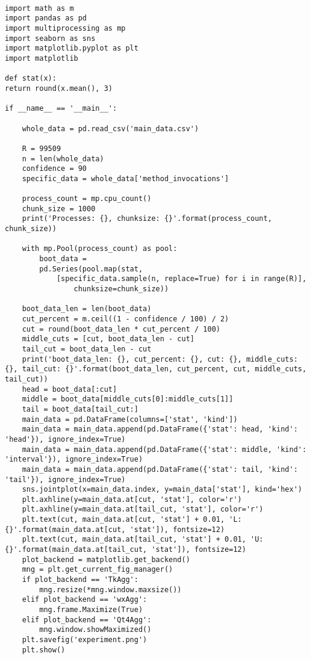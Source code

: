 \begin{lstlisting}[caption={Утилита для проведения бутстрапа и параллельных расчётов границ интервала среднего},label=bootstrap_experiment]

import math as m
import pandas as pd
import multiprocessing as mp
import seaborn as sns
import matplotlib.pyplot as plt
import matplotlib

def stat(x):
return round(x.mean(), 3)

if __name__ == '__main__':

	whole_data = pd.read_csv('main_data.csv')
	
	R = 99509
	n = len(whole_data)
	confidence = 90
	specific_data = whole_data['method_invocations']
	
	process_count = mp.cpu_count()
	chunk_size = 1000
	print('Processes: {}, chunksize: {}'.format(process_count, chunk_size))
	
	with mp.Pool(process_count) as pool:
		boot_data =
		pd.Series(pool.map(stat, 
			[specific_data.sample(n, replace=True) for i in range(R)], 
				chunksize=chunk_size))
	
	boot_data_len = len(boot_data)
	cut_percent = m.ceil((1 - confidence / 100) / 2)
	cut = round(boot_data_len * cut_percent / 100)
	middle_cuts = [cut, boot_data_len - cut]
	tail_cut = boot_data_len - cut
	print('boot_data_len: {}, cut_percent: {}, cut: {}, middle_cuts: {}, tail_cut: {}'.format(boot_data_len, cut_percent, cut, middle_cuts, tail_cut))
	head = boot_data[:cut]
	middle = boot_data[middle_cuts[0]:middle_cuts[1]]
	tail = boot_data[tail_cut:]
	main_data = pd.DataFrame(columns=['stat', 'kind'])
	main_data = main_data.append(pd.DataFrame({'stat': head, 'kind': 'head'}), ignore_index=True)
	main_data = main_data.append(pd.DataFrame({'stat': middle, 'kind': 'interval'}), ignore_index=True)
	main_data = main_data.append(pd.DataFrame({'stat': tail, 'kind': 'tail'}), ignore_index=True)
	sns.jointplot(x=main_data.index, y=main_data['stat'], kind='hex')
	plt.axhline(y=main_data.at[cut, 'stat'], color='r')
	plt.axhline(y=main_data.at[tail_cut, 'stat'], color='r')
	plt.text(cut, main_data.at[cut, 'stat'] + 0.01, 'L: {}'.format(main_data.at[cut, 'stat']), fontsize=12)
	plt.text(cut, main_data.at[tail_cut, 'stat'] + 0.01, 'U: {}'.format(main_data.at[tail_cut, 'stat']), fontsize=12)
	plot_backend = matplotlib.get_backend()
	mng = plt.get_current_fig_manager()
	if plot_backend == 'TkAgg':
		mng.resize(*mng.window.maxsize())
	elif plot_backend == 'wxAgg':
		mng.frame.Maximize(True)
	elif plot_backend == 'Qt4Agg':
		mng.window.showMaximized()
	plt.savefig('experiment.png')
	plt.show()


\end{lstlisting}


